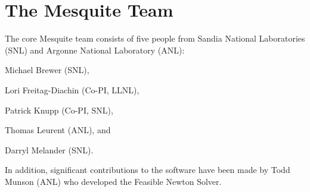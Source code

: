 \chapter{The Mesquite Team}

The core Mesquite team consists of five people from Sandia
National Laboratories (SNL) and Argonne National Laboratory (ANL): \newline

Michael Brewer (SNL), \newline

Lori Freitag-Diachin (Co-PI, LLNL), \newline

Patrick Knupp (Co-PI, SNL),\newline

Thomas Leurent (ANL), and \newline

Darryl Melander (SNL).  \newline

\noindent In addition,
significant contributions to the software have been made by
Todd Munson (ANL) who developed the Feasible Newton Solver.

